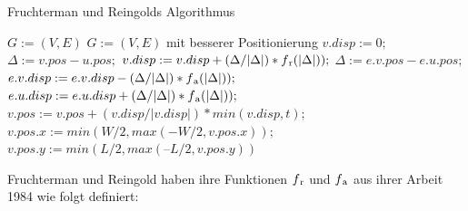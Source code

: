     \begin{algorithm}[t]
    	\centering
    	\caption[Ein Algorithmus]{Fruchterman und Reingolds Algorithmus} \label{algo_1}
    	\begin{algorithmic}
    		\REQUIRE \begin{math} G:= (V,E) \end{math}
    		\ENSURE \begin{math} G:= (V,E) \end{math} mit besserer Positionierung
    		\STATE $v.disp := 0;$
    		\STATE $\Delta := v.pos - u.pos;$
    		\STATE $v.disp := v.disp + (\Delta / |\Delta|) * f\textsubscript{r}(|\Delta|));$
    		\ENDIF
    		\ENDFOR
    		\ENDFOR
    		\newline
    		\STATE $\Delta := e.v.pos - e.u.pos;$
    		\STATE $e.v.disp := e.v.disp - (\Delta / |\Delta|) * f\textsubscript{a}(|\Delta|));$
    		\STATE $e.u.disp := e.u.disp + (\Delta / |\Delta|) * f\textsubscript{a}(|\Delta|));$
    		\ENDFOR
    		\newline
    		\STATE $v.pos := v.pos + ( v. disp/ |v.disp|) * min ( v.disp, t );$
    		\STATE $v.pos.x := min(W/2, max(-W/2, v.pos.x));$
    		\STATE $v.pos.y := min(L/2, max(–L/2, v.pos.y))$
    		\ENDFOR
    		\ENDFOR
    	\end{algorithmic}
    \end{algorithm}

Fruchterman und Reingold haben ihre Funktionen \begin{math} f\textsubscript r \end{math} und \begin{math} f\textsubscript a \end{math} aus ihrer Arbeit 1984 wie folgt definiert:

